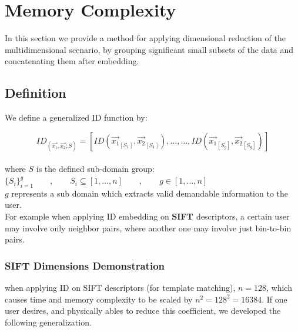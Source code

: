 
\chapter{Memory Complexity} %

\label{Chapter7}

In this section we provide a method for applying dimensional reduction of the multidimensional scenario, by grouping significant small subsets of the data and concatenating them after embedding. 


\section{Definition}

We define a generalized ID function by:

\begin{equation}
ID_(\overrightarrow{x_1} , \overrightarrow{x_2} ; S) = [ ID(\overrightarrow{x_1}_[S_1],\overrightarrow{x_2}_[S_1]) , \dots , \dots , ID(\overrightarrow{x_1}_[S_g],\overrightarrow{x_2}_[S_g])  ]
\end{equation}
\\
where $S$ is the defined sub-domain group: \\ 

$\{S_i\}_{i=1}^g \qquad,\qquad S_i\subseteq [1, \dots , n] \qquad , \qquad g \in [1, \dots , n]$ \\ 

$g$ represents a sub domain which extracts valid demandable information to the user. \\ 

For example when applying ID embedding on \textbf{SIFT \cite{lowe1999object}} descriptors, a certain user may involve only neighbor pairs, where another one may involve just bin-to-bin pairs.

\subsection{SIFT Dimensions Demonstration}

when applying ID on SIFT descriptors (for template matching),  $n = 128$, which causes time and memory complexity to be scaled by $n^2=128^2=16384$. 
If one user desires, and physically ables to reduce this coefficient, we developed the following generalization.


